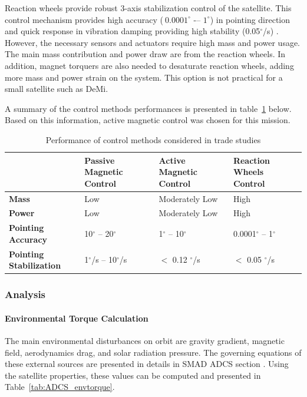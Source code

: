 \documentclass[12pt]{article}
\begin{document}
Reaction wheels provide robust 3-axis stabilization control of the satellite. This control mechanism provides high accuracy ($~ 0.0001^\circ$ -– $1^\circ$) in pointing direction and quick response in vibration damping providing high stability (0.05$^\circ$/s) \cite{adcs_smad1}. However, the necessary sensors and actuators require high mass and power usage. The main mass contribution and power draw are from the reaction wheels. In addition, magnet torquers are also needed to desaturate reaction wheels, adding more mass and power strain on the system. This option is not practical for a small satellite such as DeMi. 

A summary of the control methods performances is presented in table~\ref{tab:ADCS_trade} below. Based on this information, active magnetic control was chosen for this mission. 

\begin{table}[htbp]
  \centering
  \caption{Performance of control methods considered in trade studies}
    \begin{tabular}{|p{4cm}|p{3cm}|p{3cm}|p{3cm}|}
    \hline
          & \textbf{Passive Magnetic Control} & \textbf{Active Magnetic Control} & \textbf{Reaction Wheels Control } \bigstrut\\
    \hline
    \textbf{Mass } & Low   & Moderately Low & High  \bigstrut\\
    \hline
    \textbf{Power} & Low   & Moderately Low & High \bigstrut\\
    \hline
    \textbf{Pointing  Accuracy} &  10$^\circ$ -- 20$^\circ$ &  1$^\circ$ -- 10$^\circ$ &  0.0001$^\circ$ -- 1$^\circ$ \bigstrut\\
    \hline
    \textbf{Pointing Stabilization} & 1$^\circ$/s  -- 10$^\circ$/s & $<$ 0.12 $^\circ$/s & $<$ 0.05 $^\circ$/s \bigstrut\\
    \hline
    \end{tabular}%
  \label{tab:ADCS_trade}%
\end{table}%




			
			\subsubsection{Analysis}
			\label{adcs_analysis}
				\paragraph{Environmental Torque Calculation}
				The main environmental disturbances on orbit are gravity gradient, magnetic field, aerodynamics drag, and solar radiation pressure. The governing equations of these external sources are presented in details in SMAD ADCS section \cite{adcs_smad2}. Using the satellite properties, these values can be computed and presented in Table~\ref{tab:ADCS_envtorque}. 
				
\end{document}
